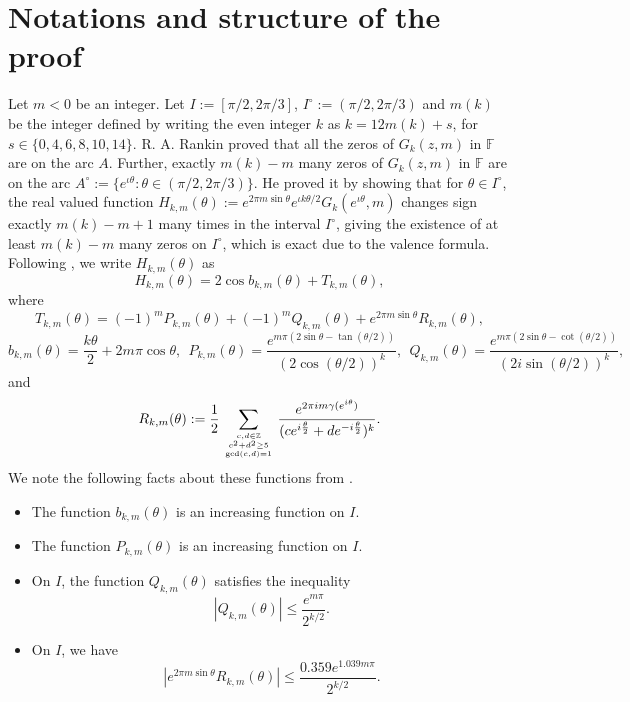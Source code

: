 \documentclass[12pt,reqno]{amsart}
\newcommand{\F}{{\mathbb F}}
\newcommand{\Z}{{\mathbb Z}}
\begin{document}
\section{Notations and structure of the proof}\label{struc}
Let $m<0$ be an integer. Let $I:=[\pi/2,2\pi/3]$, $I^{\circ}:=(\pi/2,2\pi/3)$ and $m(k)$ be the integer defined by writing the even integer $k$ as $k=12m(k)+s$, for $s\in\{0,4,6,8,10,14\}$. R. A. Rankin \cite{RR} proved that all the zeros of $G_k(z,m)$ in $\F$ are on the arc $A$. Further, exactly $m(k)-m$ many zeros of $G_k(z,m)$ in $\F$ are on the arc $A^{\circ}:=\{e^{\iota\theta}:\theta\in(\pi/2,2\pi/3)\}$.
He proved it by showing that for $\theta\in I^{\circ}$, the real valued function $H_{k,m}(\theta):=e^{2\pi m\sin\theta}e^{\iota k\theta/2}G_k(e^{\iota\theta},m)$ 
changes sign exactly $m(k)-m+1$ many times in the interval $I^{\circ}$, giving the existence of at least $m(k)-m$ many zeros on $I^{\circ}$, which is exact 
due to the valence formula. Following \cite[\S2]{KS1}, we write $H_{k,m}(\theta)$ as
\begin{equation}\label{hkm}
H_{k,m}(\theta)=2\cos b_{k,m} (\theta)+T_{k,m}(\theta),
\end{equation}
where
$$
T_{k,m}(\theta)=
(-1)^m P_{k,m}(\theta)
+(-1)^mQ_{k,m}(\theta)+e^{2\pi m \sin\theta}R_{k,m}(\theta),
$$
$$
b_{k,m}(\theta)=\frac{k\theta}{2} +2m\pi\cos\theta,\ \
P_{k,m}(\theta)=\frac{e^{m\pi(2\sin\theta-\tan(\theta/2))}}{(2\cos(\theta/2))^k}, \ \  Q_{k,m}(\theta)= \frac{e^{m\pi(2\sin\theta-\cot(\theta/2))}}{(2i\sin(\theta/2))^k},
$$
and 
$$
R_{k,m}(\theta):=\frac{1}{2}\sum_{c,d\in\Z \atop {c^2+d^2 \ge 5 \atop \gcd(c,d)=1}} 
\frac{e^{2\pi i m \gamma(e^{i\theta})}}{(ce^{i\frac{\theta}{2}}+de^{-i\frac{\theta}{2}})^k}.
$$
We note the following facts about these functions from \cite[\S2]{KS1}.
\begin{itemize}
\item[(a)] The function $b_{k,m}(\theta)$ is an increasing function on $I$.
\item[(b)] The function $P_{k,m}(\theta)$ is an increasing function on $I$.
\item[(c)] On $I$, the function $Q_{k,m}(\theta)$ satisfies the inequality
\begin{equation}\label{qkm}
|Q_{k,m}(\theta)| \le\frac{e^{m\pi}}{2^{k/2}}.
\end{equation}
\item[(d)] On $I$, we have
\begin{equation}\label{rkm}
|e^{2 \pi m\sin\theta}R_{k,m}(\theta)| \le \frac{0.359e^{1.039m\pi}}{2^{k/2}}.
\end{equation}
\end{itemize}
 
\end{document}
